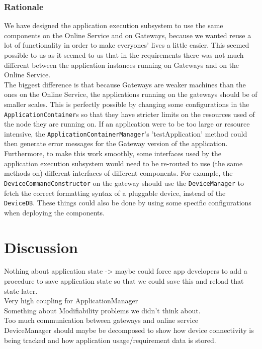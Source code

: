         \subsubsection*{Rationale}
            We have designed the application execution subsystem to use the same components on the Online Service and on Gateways,
            because we wanted reuse a lot of functionality in order to make everyones' lives a little easier. This seemed possible to us
            as it seemed to us that in the requirements there was not much different between the application instances running on Gateways
            and on the Online Service. \\
            The biggest difference is that because Gateways are weaker machines than the ones on the Online Service, the applications
            running on the gateways should be of smaller scales. This is perfectly possible by changing some configurations in the
            \texttt{ApplicationContainer}s so that they have stricter limits on the resources used of the node they are running on.
            If an application were to be too large or resource intensive, the \texttt{ApplicationContainerManager}'s 'testApplication' method
            could then generate error messages for the Gateway version of the application.\\
            Furthermore, to make this work smoothly, some interfaces used by the application execution subsystem would need to be
            re-routed to use (the same methods on) different interfaces of different components. For example, the \texttt{DeviceCommandConstructor}
            on the gateway should use the \texttt{DeviceManager} to fetch the correct formatting syntax of a pluggable device, instead of the \texttt{DeviceDB}.
            These things could also be done by using some specific configurations when deploying the components.

\section{Discussion}
    Nothing about application state -> maybe could force app developers to add a procedure to save application state so that we could save this and reload that state later.\\
    Very high coupling for ApplicationManager\\
    Something about Modifiability problems we didn't think about.\\
    Too much communication between gateways and online service\\
    DeviceManager should maybe be decomposed to show how device connectivity is being tracked and how application usage/requirement data is stored.

